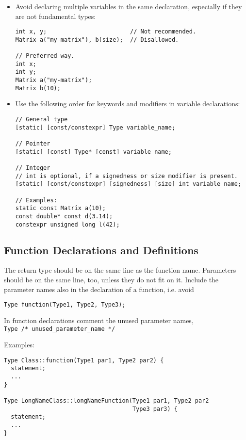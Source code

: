 \documentclass[a4paper]{article}
\newcommand{\inlinecode}[1]{\lstinline|#1|}
\begin{document}
\begin{itemize}

\item Avoid declaring multiple variables in the same declaration, especially if they are not fundamental types:

\begin{lstlisting}[showspaces=false]
int x, y;                        // Not recommended.
Matrix a("my-matrix"), b(size);  // Disallowed.

// Preferred way.
int x;
int y;
Matrix a("my-matrix");
Matrix b(10);
\end{lstlisting}

\item Use the following order for keywords and modifiers in  variable declarations:

\begin{lstlisting}[showspaces=false]
// General type
[static] [const/constexpr] Type variable_name;

// Pointer
[static] [const] Type* [const] variable_name;

// Integer
// int is optional, if a signedness or size modifier is present.
[static] [const/constexpr] [signedness] [size] int variable_name;

// Examples:
static const Matrix a(10);
const double* const d(3.14);
constexpr unsigned long l(42);
\end{lstlisting}

\end{itemize}

\subsection{Function Declarations and Definitions}

The return type should be on the same line as the function name.
Parameters should be on the same line, too, unless they do not fit on it.
Include the parameter names also in the declaration of a function, i.e. avoid
\begin{lstlisting}
Type function(Type1, Type2, Type3);
\end{lstlisting}
In function declarations comment the unused parameter names,\\
\inlinecode{Type /* unused_parameter_name */}

Examples:
\begin{lstlisting}
Type Class::function(Type1 par1, Type2 par2) {
  statement;
  ...
}

Type LongNameClass::longNameFunction(Type1 par1, Type2 par2
                                     Type3 par3) {
  statement;
  ...
}
\end{lstlisting}
\end{document}

